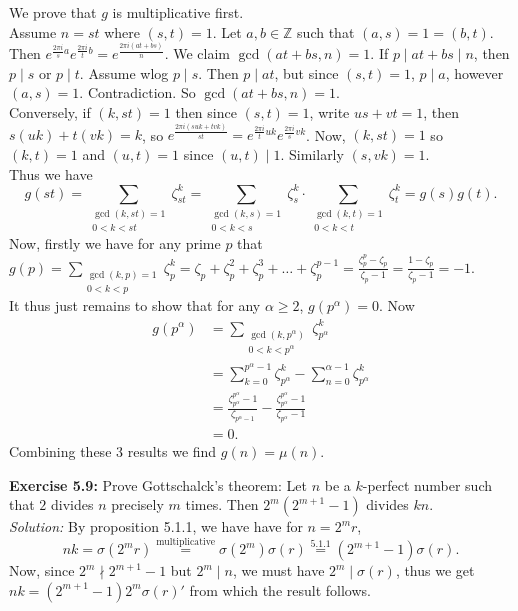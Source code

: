 \documentclass[a4paper]{article}
\begin{document}
We prove that $g$ is multiplicative first.\\
Assume $n = st$ where $(s,t)=1$. Let $a,b \in \mathbb{Z}$ such that
$(a,s)=1=(b,t)$. Then $e^{\frac{2\pi i}{s}a} e^{\frac{2 \pi i}{t}b}
= e^{\frac{2\pi i \left( at + bs  \right) }{n}}$. We claim
$\gcd(at+bs ,n)=1$. If $p  \mid at+bs  \mid n$, then $p  \mid s$ or $p \mid t$.
Assume wlog $p  \mid s$. Then $p  \mid at$, but since $(s,t)=1$, $p  \mid a$,
however $(a,s)=1$. Contradiction. So $\gcd(at+bs,n)=1$.\\
Conversely, if $(k, st)=1$ then since $(s,t)=1$, write $us+vt = 1$, then
$s(uk)+ t(vk)=k$, so
$e^{\frac{2\pi i \left( suk + tvk \right) }{st}} = e^{\frac{2\pi i}{t}uk}
e^{\frac{2 \pi i}{s}vk}$. Now, $(k,st)=1$ so $(k,t)=1$ and $(u,t)=1$ since 
$(u,t)  \mid 1$. Similarly $(s,vk)=1$.\\
Thus we have
\[
    g(st) = \sum_{\substack{\gcd(k,st)=1\\ 0 < k < st}} \zeta_{st}^{k}
    = \sum_{\substack{\gcd(k,s)=1\\ 0 < k < s}} \zeta_{s}^{k} \cdot 
    \sum_{\substack{\gcd(k,t)=1\\ 0 < k <t}} \zeta_{t}^{k} 
    = g(s) g(t).
\] 
Now, firstly we have for any prime  $p$ that
$g(p) = \sum_{\substack{\gcd(k,p)=1 \\ 0 < k <p}} \zeta_p^{k}
= \zeta_p + \zeta_p^2 + \zeta_p^3 + \ldots + \zeta_{p}^{p-1}
= \frac{\zeta_{p}^{p} - \zeta_p}{\zeta_p - 1} = \frac{1- \zeta_p}{\zeta_p - 1} 
= -1$.\\
It thus just remains to show that for any $\alpha \ge 2$, 
$g\left( p^{\alpha} \right) =0$. Now
\begin{align*}
    g\left( p^{\alpha} \right) 
    &= \sum_{\substack{\gcd(k,p^{\alpha})\\ 0<k<p^{\alpha}}}
    \zeta_{p^{\alpha}}^{k}\\
    &= \sum_{k=0}^{p^{\alpha}-1} \zeta_{p^{\alpha}}^{k} 
    - \sum_{n=0}^{\alpha - 1} \zeta_{p^{\alpha}}^{k}\\
    &= \frac{\zeta_{p^{\alpha}}^{p^{\alpha}}-1}{\zeta_{p^{\alpha}-1}}
    - \frac{\zeta_{p^{\alpha}}^{p^{\alpha}}-1}{\zeta_{p^{\alpha}}-1}\\
    &= 0.
\end{align*}
Combining these 3 results we find $g(n) = \mu(n)$.


\textbf{Exercise 5.9:} Prove Gottschalck's theorem: Let $n$ be a $k$-perfect
number such that $2$ divides $n$ precisely $m$ times. Then
$2^{m} \left( 2^{m+1}-1 \right) $ divides $kn$.\\
\linebreak
\textit{Solution:} By proposition 5.1.1, we have have for $n = 2^{m}r$,
\[
    nk = \sigma (2^{m}r) \stackrel{\text{multiplicative}}{=} \sigma(2^{m})
    \sigma(r) \stackrel{5.1.1}{=} (2^{m+1}-1) \sigma(r).
\]
Now, since $2^{m} \nmid 2^{m+1}-1$ but $2^{m} \mid n$, we must have
$2^{m} \mid \sigma(r)$, thus we get
$nk = (2^{m+1}-1) 2^{m}\sigma(r)'$ from which the result follows.
\end{document}
